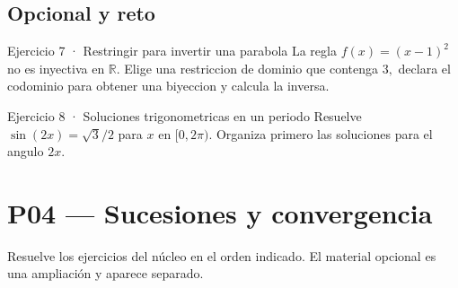 \documentclass[10pt,a4paper,oneside,openany]{book}
\begin{document}
\section*{Opcional y reto}
\begin{PSevenOptionalFixed}{Ejercicio 7 · Restringir para invertir una parabola}
La regla \(f(x)=(x-1)^{2}\) no es inyectiva en \(\mathbb{R}\). Elige una restriccion de dominio que contenga \(3,\) declara el codominio para obtener una biyeccion y calcula la inversa.
\end{PSevenOptionalFixed}
\begin{PSevenOptionalFixed}{Ejercicio 8 · Soluciones trigonometricas en un periodo}
Resuelve \(\sin(2x)=\sqrt{3}/2\) para \(x\) en \([0,2\pi )\). Organiza primero las soluciones para el angulo \(2x\).
\end{PSevenOptionalFixed}
\chapter{P04 — Sucesiones y convergencia}
Resuelve los ejercicios del núcleo en el orden indicado. El material opcional es una ampliación y aparece separado.
\end{document}
